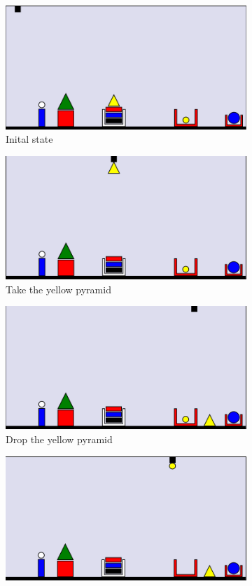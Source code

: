 \begin{figure}[p]
\centering
\begin{subfigure}{.5\textwidth}
  \centering
  \includegraphics[width=.7\linewidth]{fig/1.png}
  \caption{Inital state}
  \label{fig:1}
\end{subfigure}%
\begin{subfigure}{.5\textwidth}
  \centering
  \includegraphics[width=.7\linewidth]{fig/2.png}
  \caption{Take the yellow pyramid}
  \label{fig:2}
\end{subfigure}
\begin{subfigure}{.5\textwidth}
  \centering
  \includegraphics[width=.7\linewidth]{fig/3.png}
  \caption{Drop the yellow pyramid}
  \label{fig:3}
\end{subfigure}%
\begin{subfigure}{.5\textwidth}
  \centering
  \includegraphics[width=.7\linewidth]{fig/4.png}

\end{subfigure}
\end{figure}
